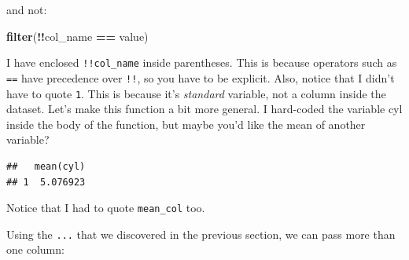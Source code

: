 \documentclass[]{gitbook}
\newenvironment{Shaded}{\begin{snugshade}}{\end{snugshade}}
\newcommand{\ControlFlowTok}[1]{\textcolor[rgb]{0.13,0.29,0.53}{\textbf{#1}}}
\newcommand{\DecValTok}[1]{\textcolor[rgb]{0.00,0.00,0.81}{#1}}
\newcommand{\KeywordTok}[1]{\textcolor[rgb]{0.13,0.29,0.53}{\textbf{#1}}}
\newcommand{\NormalTok}[1]{#1}
\newcommand{\OperatorTok}[1]{\textcolor[rgb]{0.81,0.36,0.00}{\textbf{#1}}}
\newcommand{\StringTok}[1]{\textcolor[rgb]{0.31,0.60,0.02}{#1}}
\begin{document}
and not:

\begin{Shaded}
\begin{Highlighting}[]
\KeywordTok{filter}\NormalTok{(}\OperatorTok{!!}\NormalTok{col_name }\OperatorTok{==}\StringTok{ }\NormalTok{value)}
\end{Highlighting}
\end{Shaded}

I have enclosed \texttt{!!col\_name} inside parentheses. This is because operators such as \texttt{==} have
precedence over \texttt{!!}, so you have to be explicit. Also, notice that I didn't have to quote \texttt{1}.
This is because it's \emph{standard} variable, not a column inside the dataset. Let's make this function
a bit more general. I hard-coded the variable cyl inside the body of the function, but maybe you'd
like the mean of another variable?

\begin{Shaded}
\end{Shaded}

\begin{verbatim}
##   mean(cyl)
## 1  5.076923
\end{verbatim}

Notice that I had to quote \texttt{mean\_col} too.

Using the \texttt{...} that we discovered in the previous section, we can pass more than one column:

\begin{Shaded}
\end{Shaded}
\end{document}
